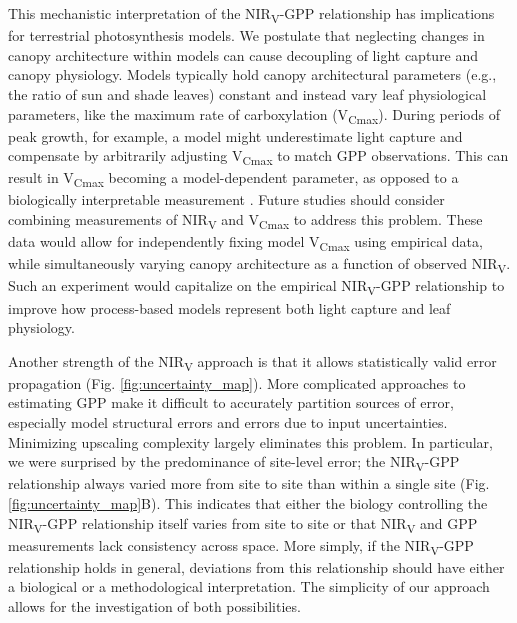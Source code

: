 \documentclass[10pt,letterpaper]{article}
\begin{document}
This mechanistic interpretation of the NIR\textsubscript{V}-GPP relationship has implications for terrestrial photosynthesis models.  We postulate that neglecting changes in canopy architecture within models can cause decoupling of light capture and canopy physiology. Models typically hold canopy architectural parameters (e.g., the ratio of sun and shade leaves) constant and instead vary leaf physiological parameters, like the maximum rate of carboxylation (V\textsubscript{Cmax}). During periods of peak growth, for example, a model might underestimate light capture and compensate by arbitrarily adjusting V\textsubscript{Cmax} to match GPP observations. This can result in V\textsubscript{Cmax} becoming a model-dependent parameter, as opposed to a biologically interpretable measurement \cite{Bonan2011}. Future studies should consider combining measurements of NIR\textsubscript{V} and V\textsubscript{Cmax} to address this problem. These data would allow for independently fixing model V\textsubscript{Cmax} using empirical data, while simultaneously varying canopy architecture as a function of observed NIR\textsubscript{V}. Such an experiment would capitalize on the empirical NIR\textsubscript{V}-GPP relationship to improve how process-based models represent both light capture and leaf physiology. 

Another strength of the NIR\textsubscript{V} approach is that it allows statistically valid error propagation (Fig. \ref{fig:uncertainty_map}). More complicated approaches to estimating GPP make it difficult to accurately partition sources of error, especially model structural errors and errors due to input uncertainties. Minimizing upscaling complexity largely eliminates this problem. In particular, we were surprised by the predominance of site-level error;  the NIR\textsubscript{V}-GPP relationship always varied more from site to site than within a single site (Fig. \ref{fig:uncertainty_map}B). This indicates that either the biology controlling the NIR\textsubscript{V}-GPP relationship itself  varies from site to site or that NIR\textsubscript{V} and GPP measurements lack consistency across space. More simply, if the NIR\textsubscript{V}-GPP relationship holds in general, deviations from this relationship should have either a biological or a methodological interpretation. The simplicity of our approach allows for the investigation of both possibilities. 
\end{document}
